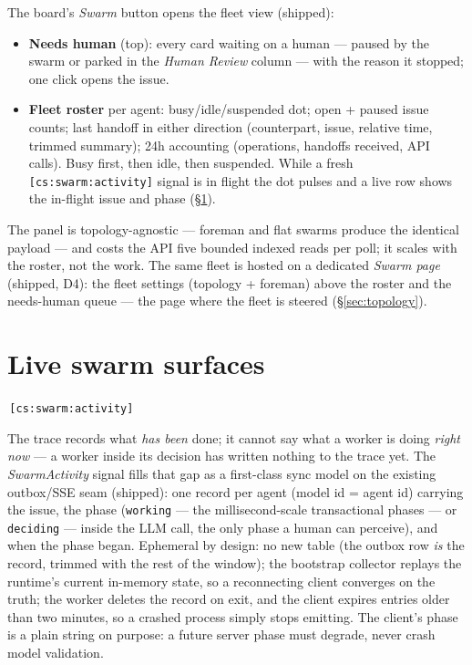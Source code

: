 \documentclass[11pt,a4paper]{report}
\newcommand{\cs}[1]{\,\texttt{\scriptsize[cs:#1]}\label{cs:#1}}
\newcommand{\csr}[1]{\,\texttt{\scriptsize[cs:#1]}}
\begin{document}
The board's \emph{Swarm} button opens the fleet view (shipped):

\begin{itemize}
\item \textbf{Needs human} (top): every card waiting on a human ---
  paused by the swarm or parked in the \emph{Human Review} column ---
  with the reason it stopped; one click opens the issue.
\item \textbf{Fleet roster} per agent: busy/idle/suspended dot; open +
  paused issue counts; last handoff in either direction (counterpart,
  issue, relative time, trimmed summary); 24h accounting (operations,
  handoffs received, API calls). Busy first, then idle, then suspended.
  While a fresh \csr{swarm:activity} signal is in flight the dot pulses
  and a live row shows the in-flight issue and phase (\S\ref{sec:activity}).
\end{itemize}

The panel is topology-agnostic --- foreman and flat swarms produce the
identical payload --- and costs the API five bounded indexed reads per
poll; it scales with the roster, not the work. The same fleet is hosted
on a dedicated \emph{Swarm page} (shipped, D4): the fleet settings
(topology + foreman) above the roster and the needs-human queue --- the
page where the fleet is steered (\S\ref{sec:topology}).

\section{Live swarm surfaces}
\label{sec:activity}
\cs{swarm:activity}

The trace records what \emph{has been} done; it cannot say what a worker
is doing \emph{right now} --- a worker inside its decision has written
nothing to the trace yet. The \emph{SwarmActivity} signal fills that gap
as a first-class sync model on the existing outbox/SSE seam (shipped):
one record per agent (model id = agent id) carrying the issue, the
phase (\texttt{working} --- the millisecond-scale transactional phases
--- or \texttt{deciding} --- inside the LLM call, the only phase a human
can perceive), and when the phase began. Ephemeral by design: no new
table (the outbox row \emph{is} the record, trimmed with the rest of the
window); the bootstrap collector replays the runtime's current in-memory
state, so a reconnecting client converges on the truth; the worker
deletes the record on exit, and the client expires entries older than
two minutes, so a crashed process simply stops emitting. The client's
phase is a plain string on purpose: a future server phase must degrade,
never crash model validation.
\end{document}
